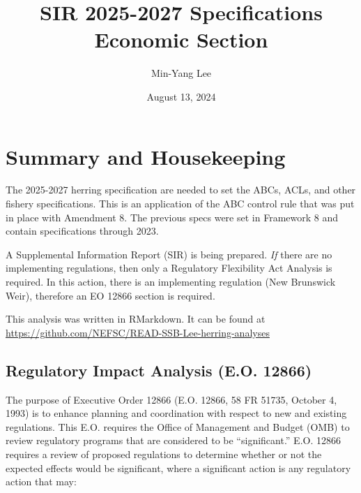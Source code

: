 \documentclass[
  12pt,
]{article}
\title{SIR 2025-2027 Specifications Economic Section}
\author{Min-Yang Lee}
\date{August 13, 2024}
\begin{document}
\maketitle

\hypertarget{summary-and-housekeeping}{%
\section{Summary and Housekeeping}\label{summary-and-housekeeping}}

The 2025-2027 herring specification are needed to set the ABCs, ACLs,
and other fishery specifications. This is an application of the ABC
control rule that was put in place with Amendment 8. The previous specs
were set in Framework 8 and contain specifications through 2023.

A Supplemental Information Report (SIR) is being prepared. \emph{If}
there are no implementing regulations, then only a Regulatory
Flexibility Act Analysis is required. In this action, there is an
implementing regulation (New Brunswick Weir), therefore an EO 12866
section is required.

This analysis was written in RMarkdown. It can be found at
\url{https://github.com/NEFSC/READ-SSB-Lee-herring-analyses}

\setcounter{section}{8}
\setcounter{subsection}{11}

\setcounter{figure}{19}
\setcounter{table}{10}

\hypertarget{regulatory-impact-analysis-e.o.-12866}{%
\subsection{Regulatory Impact Analysis (E.O.
12866)}\label{regulatory-impact-analysis-e.o.-12866}}

The purpose of Executive Order 12866 (E.O. 12866, 58 FR 51735, October
4, 1993) is to enhance planning and coordination with respect to new and
existing regulations. This E.O. requires the Office of Management and
Budget (OMB) to review regulatory programs that are considered to be
``significant.'' E.O. 12866 requires a review of proposed regulations to
determine whether or not the expected effects would be significant,
where a significant action is any regulatory action that may:
\end{document}

